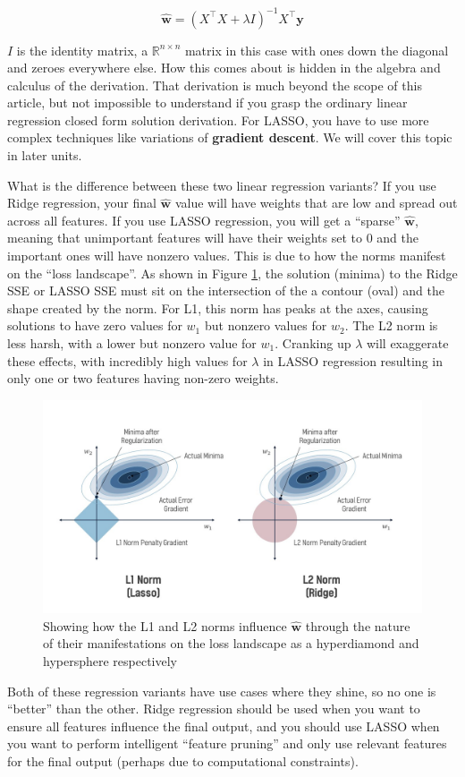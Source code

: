 \begin{flushleft}
    $$\hat{\textbf{w}} = (X^{\top}X + \lambda I)^{-1}X^{\top}\textbf{y}$$

    $I$ is the identity matrix, a $\mathbb{R}^{n \times n}$ matrix in this case with ones down the diagonal and zeroes everywhere else. How this comes about is hidden in the algebra and calculus of the derivation. That derivation is much beyond the scope of this article, but not impossible to understand if you grasp the ordinary linear regression closed form solution derivation. For LASSO, you have to use more complex techniques like variations of \textbf{gradient descent}. We will cover this topic in later units. \break

    What is the difference between these two linear regression variants? If you use Ridge regression, your final $\hat{\textbf{w}}$ value will have weights that are low and spread out across all features. If you use LASSO regression, you will get a ``sparse'' $\hat{\textbf{w}}$, meaning that unimportant features will have their weights set to 0 and the important ones will have nonzero values. This is due to how the norms manifest on the ``loss landscape''. As shown in Figure \ref{fig:l1_l2}, the solution (minima) to the Ridge SSE or LASSO SSE must sit on the intersection of the a contour (oval) and the shape created by the norm. For L1, this norm has peaks at the axes, causing solutions to have zero values for $w_1$ but nonzero values for $w_2$. The L2 norm is less harsh, with a lower but nonzero value for $w_1$. Cranking up $\lambda$ will exaggerate these effects, with incredibly high values for $\lambda$ in LASSO regression resulting in only one or two features having non-zero weights.

    \begin{figure}[H]
        \centering
        \includegraphics[width=0.9\linewidth]{ml/l1_l2.jpg}
        \caption{Showing how the L1 and L2 norms influence $\hat{\textbf{w}}$ through the nature of their manifestations on the loss landscape as a hyperdiamond and hypersphere respectively}
        \label{fig:l1_l2}
    \end{figure}

    Both of these regression variants have use cases where they shine, so no one is ``better'' than the other. Ridge regression should be used when you want to ensure all features influence the final output, and you should use LASSO when you want to perform intelligent ``feature pruning'' and only use relevant features for the final output (perhaps due to computational constraints).
\end{flushleft}

